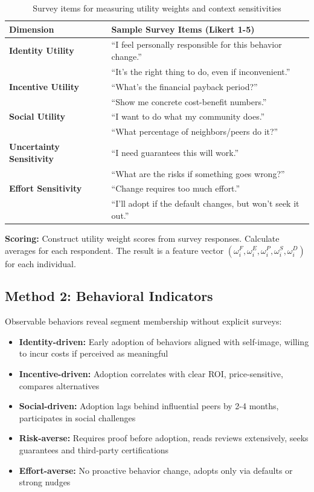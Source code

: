 \begin{table}[h]
\centering
\small
\begin{tabular}{lp{8cm}}
\toprule
\textbf{Dimension} & \textbf{Sample Survey Items (Likert 1-5)} \\
\midrule
\textbf{Identity Utility} &
``I feel personally responsible for this behavior change.'' \\
& ``It's the right thing to do, even if inconvenient.'' \\
\midrule
\textbf{Incentive Utility} &
``What's the financial payback period?'' \\
& ``Show me concrete cost-benefit numbers.'' \\
\midrule
\textbf{Social Utility} &
``I want to do what my community does.'' \\
& ``What percentage of neighbors/peers do it?'' \\
\midrule
\textbf{Uncertainty Sensitivity} &
``I need guarantees this will work.'' \\
& ``What are the risks if something goes wrong?'' \\
\midrule
\textbf{Effort Sensitivity} &
``Change requires too much effort.'' \\
& ``I'll adopt if the default changes, but won't seek it out.'' \\
\bottomrule
\end{tabular}
\caption{Survey items for measuring utility weights and context sensitivities}
\label{tab:survey-items}
\end{table}

\textbf{Scoring:} Construct utility weight scores from survey responses. Calculate
averages for each respondent. The result is a feature vector $(\omega^F_i, \omega^E_i, \omega^P_i, \omega^S_i, \omega^D_i)$ for each individual.

\subsection{Method 2: Behavioral Indicators}
\label{sec:behavioral-indicators}

Observable behaviors reveal segment membership without explicit surveys:

\begin{itemize}
    \item \textbf{Identity-driven:} Early adoption of behaviors aligned with self-image,
    willing to incur costs if perceived as meaningful
    \item \textbf{Incentive-driven:} Adoption correlates with clear ROI, price-sensitive,
    compares alternatives
    \item \textbf{Social-driven:} Adoption lags behind influential peers by 2-4 months,
    participates in social challenges
    \item \textbf{Risk-averse:} Requires proof before adoption, reads reviews extensively,
    seeks guarantees and third-party certifications
    \item \textbf{Effort-averse:} No proactive behavior change, adopts only via defaults
    or strong nudges
\end{itemize}

